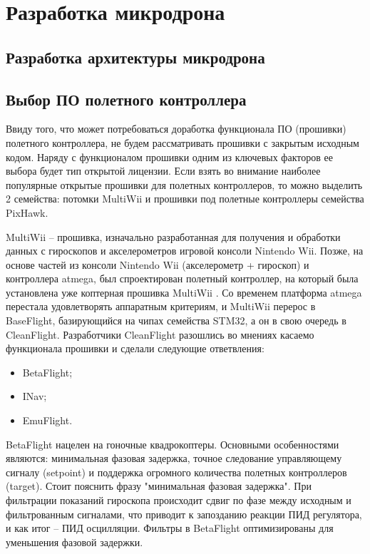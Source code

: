 
\section{Разработка микродрона}
\subsection{Разработка архитектуры микродрона}
\subsection{Выбор ПО полетного контроллера}
Ввиду того, что может потребоваться доработка функционала ПО (прошивки) полетного контроллера, не будем рассматривать прошивки с закрытым исходным кодом. Наряду с функционалом прошивки одним из ключевых факторов ее выбора будет тип открытой лицензии. Если взять во внимание наиболее популярные открытые прошивки для полетных контроллеров, то можно выделить 2 семейства: потомки MultiWii и прошивки под полетные контроллеры семейства PixHawk.

MultiWii -- прошивка, изначально разработанная для получения и обработки данных с гироскопов и акселерометров игровой консоли Nintendo Wii. Позже, на основе частей из консоли Nintendo Wii (акселерометр + гироскоп) и контроллера atmega, был спроектирован полетный контроллер, на который была установлена уже коптерная прошивка MultiWii \cite{multiwii}. Со временем платформа atmega перестала удовлетворять аппаратным критериям, и MultiWii перерос в BaseFlight, базирующийся на чипах семейства STM32, а он в свою очередь в CleanFlight. Разработчики CleanFlight разошлись во мнениях касаемо функционала прошивки и сделали следующие ответвления:
\begin{itemize}
	\item BetaFlight;
	\item INav;
	\item EmuFlight.
\end{itemize}

BetaFlight нацелен на гоночные квадрокоптеры. Основными особенностями являются: минимальная фазовая задержка, точное следование управляющему сигналу (setpoint) и поддержка огромного количества полетных контроллеров (target).
Стоит пояснить фразу "минимальная фазовая задержка". При фильтрации показаний гироскопа происходит сдвиг по фазе между исходным и фильтрованным сигналами, что приводит к запозданию реакции ПИД регулятора, и как итог -- ПИД осцилляции. Фильтры в BetaFlight оптимизированы для уменьшения фазовой задержки.

